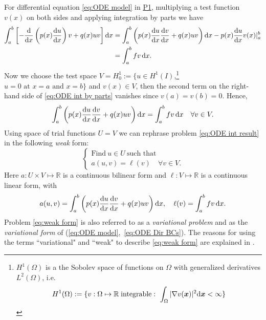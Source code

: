 	
	For differential equation \eqref{eq:ODE model} in \hyperlink{P1}{P1}, 
	multiplying a test function $v(x)$ on both sides and applying 
	integration by parts we have
	\begin{align}
	\int_a^b\left[-\frac{\mathrm{d}}{\mathrm{d} x}\left(p(x)\frac{\mathrm{d} u}{\mathrm{d} x}\right)v
		+q(x)uv\right] \mathrm{d} x &= 
	\int_a^b\left(p(x)\frac{\mathrm{d} u}{\mathrm{d} x}\frac{\mathrm{d} v}{\mathrm{d} x}+q(x)uv\right)\mathrm{d} x
		-p(x)\frac{\mathrm{d} u}{\mathrm{d} x}v(x)|_a^b \label{eq:ODE int by parts}\\
						  &=\int_a^b fv\, \mathrm{d} x. \nonumber	
	\end{align}	
	Now we choose the test space  
	$V=H_0^1:=\{u\in H^1(I)$,\footnote{ $H^1(\Omega)$ is a the
		Sobolev space of functions on $\Omega$
		with generalized derivatives $L^2(\Omega)$, i.e.
	\[ H^1(\Omega) := \{v:\Omega\mapsto\mathbb{R}\; \textrm{integrable}:\ 
	\int_{\Omega}|\nabla v(\bx)|^2 \dx < \infty \} \] }
	$u=0\textrm{ at }x=a \textrm{ and } x=b\}$ and $v(x)\in V$,
	then the second term on the right-hand side of \eqref{eq:ODE int by parts}
	vanishes since $v(a)=v(b)=0$. Hence,	
	\begin{equation} \label{eq:ODE int result}
	\int_a^b\left(p(x)\frac{\mathrm{d} u}{\mathrm{d} x}\frac{\mathrm{d} v}{\mathrm{d} x}+q(x)uv\right)\mathrm{d} x	
	 	= \int_a^b fv\, \mathrm{d} x	\quad \forall v\in V.
	\end{equation}
	Using space of trial functions $U=V$ we can rephrase problem 
	\eqref{eq:ODE int result} in the following \emph{weak} form:
	\begin{equation}\label{eq:weak form}
	\begin{cases}
	\textrm{Find}\ u\in U \ \textrm{such that}\\
	 	a(u,v)=\ell(v) \quad \forall v\in V.
	\end{cases}
	\end{equation}		
	Here $a : U \times V \mapsto \mathbb{R}$ is a continuous bilinear
	form and $\ell : V \mapsto \mathbb{R}$ is a continuous linear form,
	with
	\begin{equation}
	a(u,v)=\int_a^b\left(p(x)\frac{\mathrm{d} u}{\mathrm{d} x}\frac{\mathrm{d} v}{\mathrm{d} x}+
		q(x)uv\right)\mathrm{d} x, \quad \ell(v)=\int_a^b fv\, \mathrm{d} x.
	\end{equation}
	Problem \eqref{eq:weak form} is also referred to as a  
	\emph{variational problem} and as the \emph{variational form} of 
	(\ref{eq:ODE model},~\ref{eq:ODE Dir BCs}). The reasons for using the terms
	``variational" and ``weak" to describe \eqref{eq:weak form} are explained
	in \cite{UIFEM}.\\	
	

